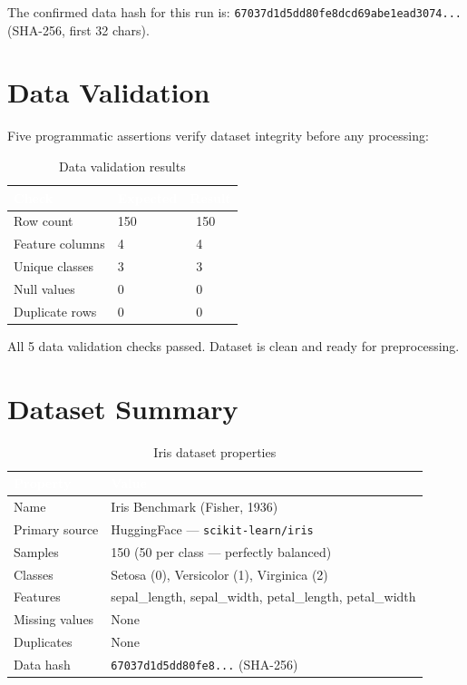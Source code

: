 \documentclass[12pt, a4paper]{report}
\newcommand{\cmark}{\textcolor{success}{\ding{51}}}
\newcommand{\code}[1]{\texttt{\small\textcolor{primary}{#1}}}
\begin{document}
The confirmed data hash for this run is:
\code{67037d1d5dd80fe8dcd69abe1ead3074...} (SHA-256, first 32 chars).

\section{Data Validation}

Five programmatic assertions verify dataset integrity before any processing:

\begin{table}[H]
\centering
\caption{Data validation results}
\begin{tabular}{@{}L{5cm}C{3cm}C{4cm}@{}}
\toprule
{}\textcolor{white}{\textbf{Check}} &
\textcolor{white}{\textbf{Expected}} &
\textcolor{white}{\textbf{Result}} \\
\midrule
Row count         & 150           & \cmark\ 150 \\
Feature columns   & 4             & \cmark\ 4 \\
Unique classes    & 3             & \cmark\ 3 \\
Null values       & 0             & \cmark\ 0 \\
Duplicate rows    & 0             & \cmark\ 0 \\
\bottomrule
\end{tabular}
\end{table}

\begin{resultbox}
All 5 data validation checks passed. Dataset is clean and ready for preprocessing.
\end{resultbox}

\section{Dataset Summary}

\begin{table}[H]
\centering
\caption{Iris dataset properties}
\begin{tabular}{@{}L{5cm}L{8cm}@{}}
\toprule
{}\textcolor{white}{\textbf{Property}} &
\textcolor{white}{\textbf{Value}} \\
\midrule
Name              & Iris Benchmark (Fisher, 1936) \\
Primary source    & HuggingFace — \code{scikit-learn/iris} \\
Samples           & 150 (50 per class — perfectly balanced) \\
Classes           & Setosa (0), Versicolor (1), Virginica (2) \\
Features          & sepal\_length, sepal\_width, petal\_length, petal\_width \\
Missing values    & None \\
Duplicates        & None \\
Data hash         & \code{67037d1d5dd80fe8...} (SHA-256) \\
\bottomrule
\end{tabular}
\end{table}
\end{document}
